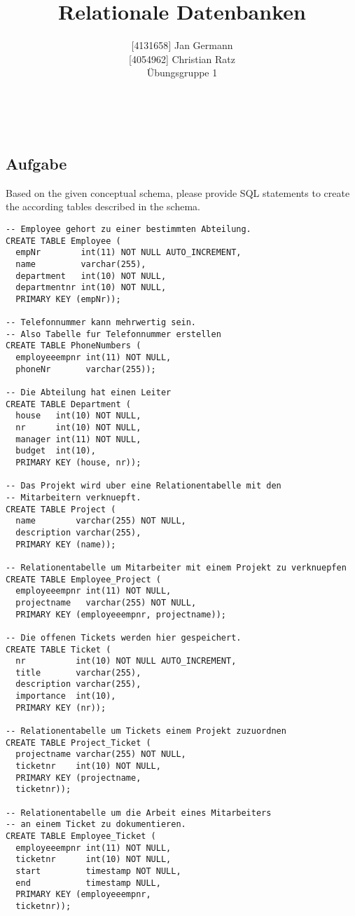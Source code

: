 \documentclass[11pt,a4paper,DIV=9]{scrartcl}
\author{{[}4131658{]} Jan Germann \\{[}4054962{]} Christian Ratz\\Übungsgruppe 1}
\title{Relationale Datenbanken}
\newcounter{temp}
\newcommand{\aufgabe}[1]{
  \setcounter{temp}{\value{subsection}}
  \setcounter{subsection}{#1}
  \addtocounter{subsection}{-1}
  \subsection{Aufgabe}
  \setcounter{subsection}{\value{temp}}
}
\renewcommand{\author}[1]{\renewcommand{\author}{#1}}
\renewcommand{\title}[1]{\renewcommand{\title}{#1}}
\newcommand{\makehomeworktitle}{
  \begin{minipage}[t]{6.5cm}
    \sf{\author}
  \end{minipage}
  \begin{minipage}[t]{6.5cm}
    \begin{flushright}
      \sf{\title\\\today}
    \end{flushright}
  \end{minipage}
  \\[0.2cm]
  \begin{center}
    \sf{
      \color{blue}{
        \LARGE{Aufgabenblatt \blattnr}
      }
    }
  \end{center}
  \vspace{0.1cm}
}
\begin{document}
\makehomeworktitle
   \aufgabe{1}
   Based on the given conceptual schema, please provide SQL statements to create the according tables described in the schema.
\begin{lstlisting}
-- Employee gehort zu einer bestimmten Abteilung.
CREATE TABLE Employee (
  empNr        int(11) NOT NULL AUTO_INCREMENT, 
  name         varchar(255), 
  department   int(10) NOT NULL, 
  departmentnr int(10) NOT NULL, 
  PRIMARY KEY (empNr));

-- Telefonnummer kann mehrwertig sein. 
-- Also Tabelle fur Telefonnummer erstellen
CREATE TABLE PhoneNumbers (
  employeeempnr int(11) NOT NULL, 
  phoneNr       varchar(255));

-- Die Abteilung hat einen Leiter
CREATE TABLE Department (
  house   int(10) NOT NULL, 
  nr      int(10) NOT NULL, 
  manager int(11) NOT NULL, 
  budget  int(10), 
  PRIMARY KEY (house, nr));

-- Das Projekt wird uber eine Relationentabelle mit den
-- Mitarbeitern verknuepft.
CREATE TABLE Project (
  name        varchar(255) NOT NULL, 
  description varchar(255), 
  PRIMARY KEY (name));

-- Relationentabelle um Mitarbeiter mit einem Projekt zu verknuepfen
CREATE TABLE Employee_Project (
  employeeempnr int(11) NOT NULL, 
  projectname   varchar(255) NOT NULL, 
  PRIMARY KEY (employeeempnr, projectname));

-- Die offenen Tickets werden hier gespeichert.
CREATE TABLE Ticket (
  nr          int(10) NOT NULL AUTO_INCREMENT, 
  title       varchar(255), 
  description varchar(255), 
  importance  int(10), 
  PRIMARY KEY (nr));

-- Relationentabelle um Tickets einem Projekt zuzuordnen
CREATE TABLE Project_Ticket (
  projectname varchar(255) NOT NULL, 
  ticketnr    int(10) NOT NULL, 
  PRIMARY KEY (projectname, 
  ticketnr));

-- Relationentabelle um die Arbeit eines Mitarbeiters
-- an einem Ticket zu dokumentieren.
CREATE TABLE Employee_Ticket (
  employeeempnr int(11) NOT NULL, 
  ticketnr      int(10) NOT NULL, 
  start         timestamp NOT NULL, 
  end           timestamp NULL, 
  PRIMARY KEY (employeeempnr, 
  ticketnr));


\end{lstlisting}
\end{document}
